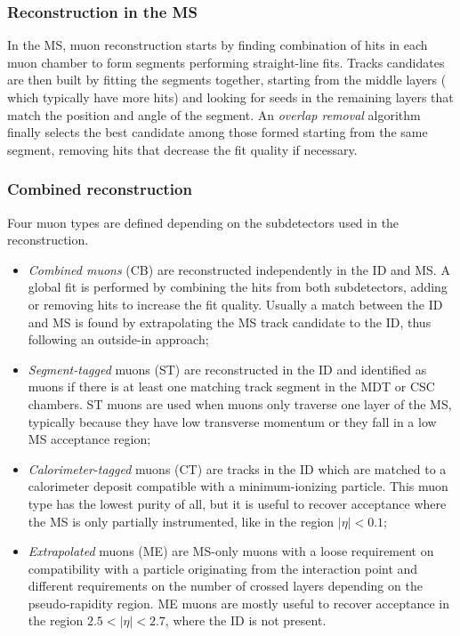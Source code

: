 \documentclass[a4paper,twoside,12pt]{article}
\begin{document}
\subsubsection*{Reconstruction in the MS}
In the MS, muon reconstruction starts by finding combination of hits in each muon chamber
to form segments performing straight-line fits. Tracks candidates are then built by fitting the
segments together\cite{muonReconstruction}, starting from the middle layers (
which typically have more hits) and looking for seeds in the remaining layers that match
the position and angle of the segment. An \textit{overlap removal} algorithm finally
selects the best candidate among those formed starting from the same segment, 
removing hits that decrease the fit quality if necessary.

\subsubsection*{Combined reconstruction}
Four muon types are defined depending on the subdetectors used in the reconstruction.\\

\begin{itemize}
\item \textit{Combined muons} (CB) are reconstructed independently in the ID and MS.
A global fit is performed by combining the hits from both subdetectors, adding or removing
hits to increase the fit quality. Usually a match between the ID and MS is found by 
extrapolating the MS track candidate to the ID, thus following an outside-in approach;

\item \textit{Segment-tagged} muons (ST) are reconstructed in the ID and identified
as muons if there is at least one matching track segment in the MDT or CSC chambers. ST
muons are used when muons only traverse one layer of the MS, typically because they
have low transverse momentum or they fall in a low MS acceptance region;

\item \textit{Calorimeter-tagged} muons (CT) are tracks in the ID which are matched to
a calorimeter deposit compatible with a minimum-ionizing particle. This muon type has
the lowest purity of all, but it is useful to recover acceptance where the MS is only 
partially instrumented, like in the region $|\eta|  < 0.1$;

\item \textit{Extrapolated} muons (ME) are MS-only muons with a loose requirement
on compatibility with a particle originating from the interaction point and different
requirements on the number of crossed layers depending on the pseudo-rapidity region.
ME muons are mostly useful to recover acceptance in the region $2.5 < |\eta| < 2.7$, where
the ID is not present. 
\end{itemize}
\end{document}
